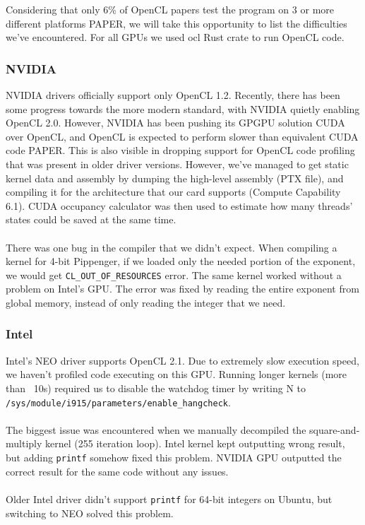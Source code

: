 Considering that only 6\% of OpenCL papers test the program on 3 or more different platforms PAPER, we will take this opportunity to list the difficulties we've encountered. For all GPUs we used ocl Rust crate to run OpenCL code.

\subsubsection{NVIDIA}
NVIDIA drivers officially support only OpenCL 1.2. Recently, there has been some progress towards the more modern standard, with NVIDIA quietly enabling OpenCL 2.0. However, NVIDIA has been pushing its GPGPU solution CUDA over OpenCL, and OpenCL is expected to perform slower than equivalent CUDA code PAPER. This is also visible in dropping support for OpenCL code profiling that was present in older driver versions. However, we've managed to get static kernel data and assembly by dumping the high-level assembly (PTX file), and compiling it for the architecture that our card supports (Compute Capability 6.1). CUDA occupancy calculator was then used to estimate how many threads' states could be saved at the same time.\\
\\
There was one bug in the compiler that we didn't expect. When compiling a kernel for 4-bit Pippenger, if we loaded only the needed portion of the exponent, we would get \texttt{CL\_OUT\_OF\_RESOURCES} error. The same kernel worked without a problem on Intel's GPU. The error was fixed by reading the entire exponent from global memory, instead of only reading the integer that we need.

\subsubsection{Intel}
Intel's NEO driver supports OpenCL 2.1. Due to extremely slow execution speed, we haven't profiled code executing on this GPU. Running longer kernels (more than ~10s) required us to disable the watchdog timer by writing N to \texttt{/sys/module/i915/parameters/enable\_hangcheck}.\\
\\
The biggest issue was encountered when we manually decompiled the square-and-multiply kernel (255 iteration loop). Intel kernel kept outputting wrong result, but adding \texttt{printf} somehow fixed this problem. NVIDIA GPU outputted the correct result for the same code without any issues.\\
\\
Older Intel driver didn't support \texttt{printf} for 64-bit integers on Ubuntu, but switching to NEO solved this problem. 

